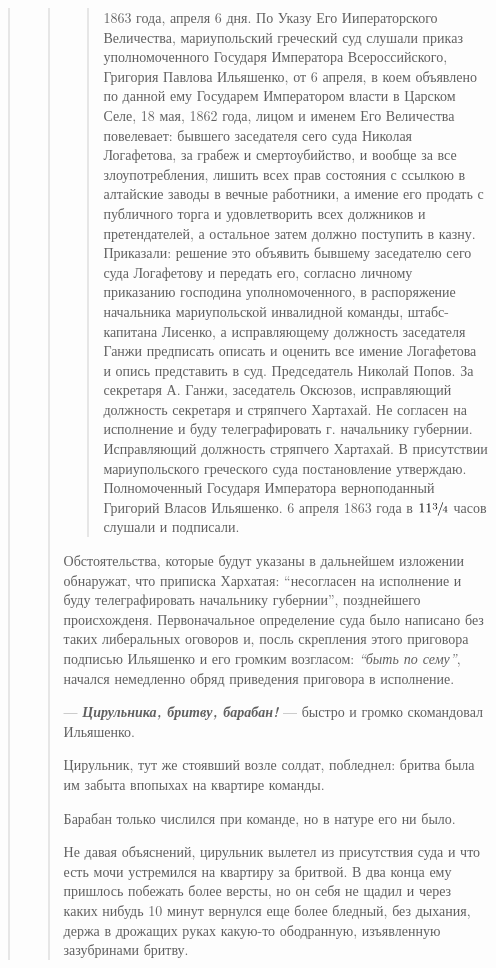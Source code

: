 \begin{quote}
\begin{quote}
\begin{quote}
1863 года, апреля 6 дня. По Указу Его Ииператорского Величества, мариупольский греческий суд слушали
приказ уполномоченного Государя Императора Всероссийского,
Григория Павлова Ильяшенко, от 6 апреля, в коем объявлено 
по данной ему Государем Императором власти в
Царском Селе, 18 мая, 1862 года, лицом и именем
Его Величества повелевает: бывшего заседателя сего суда
Николая Логафетова, за грабеж и смертоубийство, и вообще
за все злоупотребления, лишить всех прав состояния с
ссылкою в алтайские заводы в вечные работники, а имение
его продать с публичного торга и удовлетворить всех
должников и претендателей, а остальное затем должно
поступить в казну. Приказали: решение это объявить бывшему заседателю сего суда 
Логафетову и передать его, согласно личному приказанию господина уполномоченного, в
распоряжение начальника мариупольской инвалидной команды,
штабс-капитана Лисенко, а исправляющему должность заседателя Ганжи 
предписать описать и оценить все имение
Логафетова и опись представить в суд. Председатель Николай Попов. 
За секретаря А. Ганжи, заседатель Оксюзов,
исправляющий должность секретаря и стряпчего Хартахай.
Не согласен на исполнение и буду телеграфировать г. начальнику губернии. 
Исправляющий должность стряпчего Хартахай. В присутствии мариупольского греческого суда постановление 
утверждаю. Полномоченный Государя Императора
верноподанный Григорий Власов Ильяшенко. 6 апреля 1863
года в $11 \sfrac{3}{4}$ часов слушали и подписали.

\end{quote}

Обстоятельства, которые будут указаны в дальнейшем
изложении обнаружат, что приписка Хархатая: ``несогласен
на исполнение и буду телеграфировать начальнику губернии'',
позднейшего происхожденя. Первоначальное определение суда
было написано без таких либеральных оговоров и, посль
скрепления этого приговора подписью Ильяшенко и его громким возгласом: 
\emph{``быть по сему''}, начался немедленно обряд приведения 
приговора в исполнение.

— \textbf{\emph{Цирульника, бритву, барабан!}} — быстро и громко скомандовал Ильяшенко.

Цирульник, тут же стоявший возле солдат, побледнел: бритва была им забыта
впопыхах на квартире команды.

Барабан только числился при команде, но в натуре его ни было.

Не давая объяснений, цирульник вылетел из присутствия суда и что есть мочи
устремился на квартиру за бритвой. В два конца ему пришлось побежать более
версты, но он себя не щадил и через каких нибудь 10 минут вернулся еще более
бледный, без дыхания, держа в дрожащих руках какую-то ободранную, изъявленную
зазубринами бритву.


\end{quote}
\end{quote}
